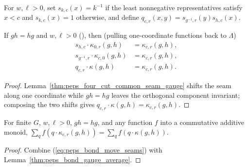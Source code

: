 \begin{definition}%
    \label{def:peps_bond_seam_gauge}
    \leanok
    For $w,\ell>0$, set $s_{k,c}(x)=k^{-1}$ if the least nonnegative representatives satisfy $x<c$ and $s_{k,c}(x)=1$ otherwise, and define $q_{c,r}(x,y)=s_{g^{-1},r}(y)s_{h,c}(x)$.
\end{definition}

\begin{lemma}%
    \label{thm:peps_bond_seam_movement}
    \leanok
    If $gh=hg$ and $w,\ell>0$ (\cite[Section~5]{Schuch2010PEPS}), then (pulling one-coordinate functions back to $\Lambda$)
    \begin{align}
        s_{h,c}\cdot\kappa_{0,r}(g,h)      & =\kappa_{c,r}(g,h),\nonumber \\
        s_{g^{-1},r}\cdot\kappa_{c,0}(g,h) & =\kappa_{c,r}(g,h),\nonumber \\
        q_{c,r}\cdot\kappa(g,h)            & =\kappa_{c,r}(g,h).
        \label{eq:peps_bond_move_seams}
    \end{align}
\end{lemma}
\begin{proof}\leanok
    Lemma~\ref{thm:peps_four_cut_common_seam_gauge} shifts the seam along one coordinate while $gh=hg$ leaves the orthogonal component invariant; composing the two shifts gives $q_{c,r}\cdot\kappa(g,h)=\kappa_{c,r}(g,h)$.
\end{proof}

\begin{lemma}%
    \label{thm:peps_bond_seam_average}
    \leanok
    For finite $G$, $w,\ell>0$, $gh=hg$, and any function $f$ into a commutative additive monoid, $\sum_q f(q\cdot\kappa_{c,r}(g,h))=\sum_q f(q\cdot\kappa(g,h))$.
\end{lemma}
\begin{proof}\leanok
    Combine (\ref{eq:peps_bond_move_seams}) with Lemma~\ref{thm:peps_bond_gauge_average}.
\end{proof}

